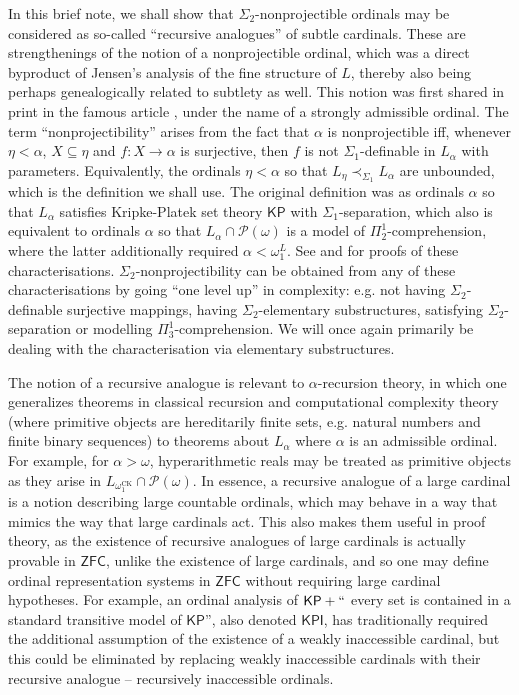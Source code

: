 \documentclass{article}
\newcommand{\KP}{\mathsf{KP}}
\newcommand{\ZFC}{\mathsf{ZFC}}
\theoremstyle{definition}
\theoremstyle{plain}
\theoremstyle{plain}
\theoremstyle{plain}
\theoremstyle{plain}
\theoremstyle{remark}
\theoremstyle{remark}
\theoremstyle{remark}
\theoremstyle{plain}
\theoremstyle{plain}
\theoremstyle{plain}
\begin{document}
In this brief note, we shall show that $\Sigma_2$-nonprojectible ordinals may be considered as so-called ``recursive analogues'' of subtle cardinals. These are strengthenings of the notion of a nonprojectible ordinal, which was a direct byproduct of Jensen's analysis of the fine structure of $L$, thereby also being perhaps genealogically related to subtlety as well. This notion was first shared in print in the famous article \cite{jensen2}, under the name of a strongly admissible ordinal. The term ``nonprojectibility'' arises from the fact that $\alpha$ is nonprojectible iff, whenever $\eta < \alpha$, $X \subseteq \eta$ and $f: X \to \alpha$ is surjective, then $f$ is not $\Sigma_1$-definable in $L_\alpha$ with parameters. Equivalently, the ordinals $\eta < \alpha$ so that $L_\eta \prec_{\Sigma_1} L_\alpha$ are unbounded, which is the definition we shall use. The original definition was as ordinals $\alpha$ so that $L_\alpha$ satisfies Kripke-Platek set theory $\KP$ with $\Sigma_1$-separation, which also is equivalent to ordinals $\alpha$ so that $L_\alpha \cap \mathcal{P}(\omega)$ is a model of $\Pi^1_2$-comprehension, where the latter additionally required $\alpha < \omega_1^L$. See \cite{barwise} and \cite{simpson} for proofs of these characterisations. $\Sigma_2$-nonprojectibility can be obtained from any of these characterisations by going ``one level up'' in complexity: e.g. not having $\Sigma_2$-definable surjective mappings, having $\Sigma_2$-elementary substructures, satisfying $\Sigma_2$-separation or modelling $\Pi^1_3$-comprehension. We will once again primarily be dealing with the characterisation via elementary substructures.

The notion of a recursive analogue is relevant to $\alpha$-recursion theory, in which one generalizes theorems in classical recursion and computational complexity theory (where primitive objects are hereditarily finite sets, e.g. natural numbers and finite binary sequences) to theorems about $L_\alpha$ where $\alpha$ is an admissible ordinal. For example, for $\alpha > \omega$, hyperarithmetic reals may be treated as primitive objects as they arise in $L_{\omega_1^{\mathrm{CK}}} \cap \mathcal{P}(\omega)$. In essence, a recursive analogue of a large cardinal is a notion describing large countable ordinals, which may behave in a way that mimics the way that large cardinals act. This also makes them useful in proof theory, as the existence of recursive analogues of large cardinals is actually provable in $\ZFC$, unlike the existence of large cardinals, and so one may define ordinal representation systems in $\ZFC$ without requiring large cardinal hypotheses. For example, an ordinal analysis of $\KP + ``$ every set is contained in a standard transitive model of $\KP$'', also denoted $\mathsf{KPI}$, has traditionally required the additional assumption of the existence of a weakly inaccessible cardinal, but this could be eliminated by replacing weakly inaccessible cardinals with their recursive analogue -- recursively inaccessible ordinals.
\end{document}
